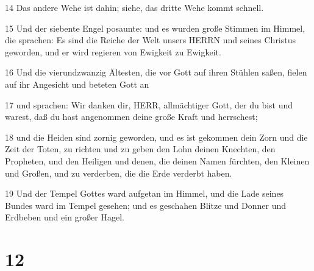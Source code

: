 \par 14 Das andere Wehe ist dahin; siehe, das dritte Wehe kommt schnell.
\par 15 Und der siebente Engel posaunte: und es wurden große Stimmen im Himmel, die sprachen: Es sind die Reiche der Welt unsers HERRN und seines Christus geworden, und er wird regieren von Ewigkeit zu Ewigkeit.
\par 16 Und die vierundzwanzig Ältesten, die vor Gott auf ihren Stühlen saßen, fielen auf ihr Angesicht und beteten Gott an
\par 17 und sprachen: Wir danken dir, HERR, allmächtiger Gott, der du bist und warest, daß du hast angenommen deine große Kraft und herrschest;
\par 18 und die Heiden sind zornig geworden, und es ist gekommen dein Zorn und die Zeit der Toten, zu richten und zu geben den Lohn deinen Knechten, den Propheten, und den Heiligen und denen, die deinen Namen fürchten, den Kleinen und Großen, und zu verderben, die die Erde verderbt haben.
\par 19 Und der Tempel Gottes ward aufgetan im Himmel, und die Lade seines Bundes ward im Tempel gesehen; und es geschahen Blitze und Donner und Erdbeben und ein großer Hagel.

\chapter{12}

